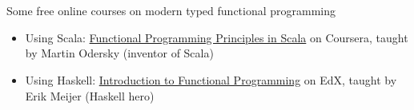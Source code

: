 \appendix

\section*{\appendixname}

\begin{frame}{Some free online courses on modern typed functional programming}
  \begin{itemize}
  \item Using Scala: \href{http://www.coursera.org/course/progfun}{Functional Programming Principles in Scala} on Coursera, taught by Martin Odersky (inventor of Scala)
  \item Using Haskell: \href{http://www.edx.org/course/delftx/delftx-fp101x-introduction-functional-2126}{Introduction to Functional Programming} on EdX, taught by Erik Meijer (Haskell hero)
  \end{itemize}
\end{frame}



